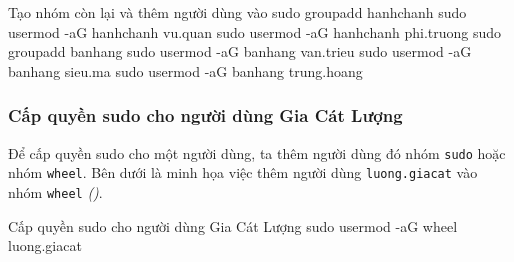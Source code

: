 \vspace{0.5cm}
\begin{coding}{Tạo nhóm còn lại và thêm người dùng vào}
  sudo groupadd hanhchanh
  sudo usermod -aG hanhchanh vu.quan
  sudo usermod -aG hanhchanh phi.truong
  sudo groupadd banhang
  sudo usermod -aG banhang van.trieu
  sudo usermod -aG banhang sieu.ma
  sudo usermod -aG banhang trung.hoang
\end{coding}


\subsubsection{Cấp quyền sudo cho người dùng Gia Cát Lượng}

Để cấp quyền sudo cho một người dùng, ta thêm người dùng đó nhóm \texttt{sudo} hoặc nhóm
\texttt{wheel}. Bên dưới là minh họa việc thêm người dùng \texttt{luong.giacat} vào nhóm
\texttt{wheel} \textit{()}.


\vspace{0.5cm}
\begin{coding}{Cấp quyền sudo cho người dùng Gia Cát Lượng}
  sudo usermod -aG wheel luong.giacat
\end{coding}
